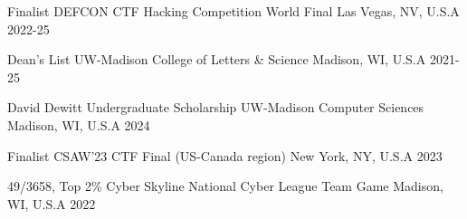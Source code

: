 



\begin{cvhonors}

  \cvhonor
    {Finalist} %
    {DEFCON CTF Hacking Competition World Final} %
    {Las Vegas, NV, U.S.A} %
    {2022-25} %

  \cvhonor
    {Dean's List} %
    {UW-Madison College of Letters \& Science} %
    {Madison, WI, U.S.A} %
    {2021-25} %

  \cvhonor
    {David Dewitt Undergraduate Scholarship} %
    {UW-Madison Computer Sciences} %
    {Madison, WI, U.S.A} %
    {2024} %

  \cvhonor
    {Finalist} %
    {CSAW'23 CTF Final (US-Canada region)} %
    {New York, NY, U.S.A} %
    {2023} %

  \cvhonor
    {49/3658, Top 2\%} %
    {Cyber Skyline National Cyber League Team Game} %
    {Madison, WI, U.S.A} %
    {2022} %

\end{cvhonors}

